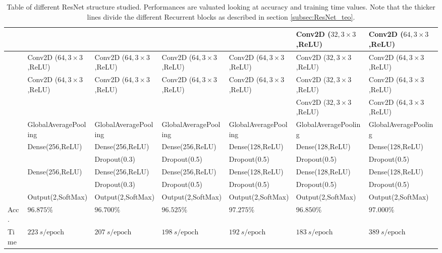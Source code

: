 \begin{table}
\begin{tabular}{l|l|l|l|l|l|l}
         & &  &  &  & Conv2D ($32,3\times3$,ReLU) & Conv2D ($64,3\times3$,ReLU) \\
         \midrule
         
         &Conv2D ($64,3\times3$,ReLU) & Conv2D ($64,3\times3$,ReLU) & Conv2D ($64,3\times3$,ReLU) & Conv2D ($64,3\times3$,ReLU) & Conv2D ($32,3\times3$,ReLU) & Conv2D ($64,3\times3$,ReLU) \\
         
         &Conv2D ($64,3\times3$,ReLU) & Conv2D ($64,3\times3$,ReLU) & Conv2D ($64,3\times3$,ReLU) & Conv2D ($64,3\times3$,ReLU) & Conv2D ($32,3\times3$,ReLU) & Conv2D ($64,3\times3$,ReLU) \\
         
         & &  &  &  & Conv2D ($32,3\times3$,ReLU) & Conv2D ($64,3\times3$,ReLU) \\
         \midrule         
         
         &GlobalAveragePooling & GlobalAveragePooling & GlobalAveragePooling & GlobalAveragePooling & GlobalAveragePooling & GlobalAveragePooling \\
         
         &Dense(256,ReLU) & Dense(256,ReLU) & Dense(256,ReLU) & Dense(128,ReLU) & Dense(128,ReLU) & Dense(128,ReLU) \\
         
         & & Dropout(0.3) & Dropout(0.5) & Dropout(0.5) & Dropout(0.5) & Dropout(0.5) \\
         
         &Dense(256,ReLU) & Dense(256,ReLU) & Dense(256,ReLU) & Dense(128,ReLU) & Dense(128,ReLU) & Dense(128,ReLU) \\
         
         & & Dropout(0.3) & Dropout(0.5) & Dropout(0.5) & Dropout(0.5) & Dropout(0.5) \\
         
         &Output(2,SoftMax) & Output(2,SoftMax) & Output(2,SoftMax) & Output(2,SoftMax) & Output(2,SoftMax) & Output(2,SoftMax) \\
         \midrule
         Acc. & $96.875\%$ & $96.700\%$ & $96.525\%$ & $97.275\%$ & $96.850\%$ & $97.000\%$ \\
         Time & $223\ s/\text{epoch}$ &  $207\ s/\text{epoch}$ & $198\ s/\text{epoch}$ & $192\ s/\text{epoch}$ & $183\ s/\text{epoch}$ & $389\ s/\text{epoch}$\\
         \bottomrule
    \end{tabular}
    \caption{Table of different ResNet structure studied. Performances are valuated looking at accuracy and training time values. Note that the thicker lines divide the different Recurrent blocks as described in section \ref{subsec:ResNet_teo}.}
    \label{fig:ResNet-tested}
\end{table}

